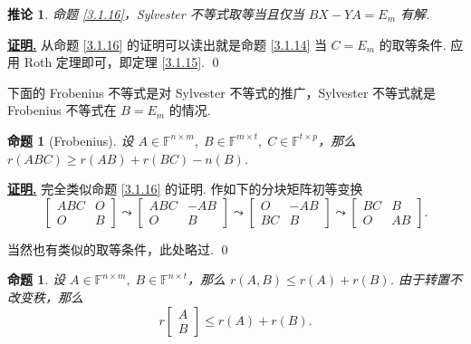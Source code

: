 \documentclass[10pt,openany]{article}
\theoremstyle{thmstyle} %
\theoremstyle{defstyle} %
\newtheorem{corollary}[theorem]{推论}
\theoremstyle{prostyle} %
\newtheorem{proposition}[theorem]{命题}
\theoremstyle{exastyle}
\theoremstyle{remstyle}
\renewenvironment{proof}[1][证明]{\par\underline{\textbf{#1.}} \;\fangsong}{\qed\par}
\newcommand{\F}{\mathbb{F}}
\newcommand{\nm}{^{n \times m}}
\begin{document}
\begin{corollary}
	命题 \ref{3.1.16}，Sylvester 不等式取等当且仅当 \( BX-YA=E_m \) 有解.
\end{corollary}

\begin{proof}
	从命题 \ref{3.1.16} 的证明可以读出就是命题 \ref{3.1.14} 当 \( C=E_m \) 的取等条件. 应用 Roth 定理即可，即定理 \ref{3.1.15}. 
\end{proof}

下面的 Frobenius 不等式是对 Sylvester 不等式的推广，Sylvester 不等式就是 Frobenius 不等式在 \( B=E_m \) 的情况.

\begin{proposition}[Frobenius] \label{3.1.18}
	设 \( A \in \F\nm, \; B \in \F^{m \times t}, \; C \in \F^{t \times p} \)，那么 \( r(ABC) \geq r(AB)+r(BC)-n(B) \). 
\end{proposition}

\begin{proof}
	完全类似命题 \ref{3.1.16} 的证明. 作如下的分块矩阵初等变换
	\[ \begin{bmatrix}
		ABC & O \\ O & B
	\end{bmatrix} \leadsto \begin{bmatrix}
		ABC & -AB \\ O & B
	\end{bmatrix} \leadsto \begin{bmatrix}
		O & -AB \\ BC & B
	\end{bmatrix} \leadsto \begin{bmatrix}
		BC & B \\ O & AB
	\end{bmatrix}. \]
	
	当然也有类似的取等条件，此处略过.
\end{proof}

\begin{proposition} \label{3.1.19}
	设 \( A \in \F\nm, \; B \in \F^{n \times t} \)，那么 \( r(A,B) \leq r(A)+r(B) \). 由于转置不改变秩，那么
	\[ r \begin{bmatrix}
		A \\ B
	\end{bmatrix} \leq r(A)+r(B). \]
\end{proposition}
\end{document}

